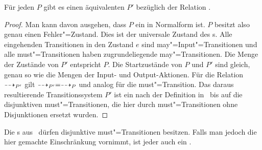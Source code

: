 \begin{Satz}
  Für jeden \MEIO{} $P$ gibt es einen äquivalenten \MIA{} $P'$ bezüglich der
  Relation \ERel{}.
\end{Satz}
\begin{proof}
  Man kann \oBdA{} davon ausgehen, dass $P$ ein \MEIO{} in Normalform ist. $P$
  besitzt also genau einen Fehler"=Zustand. Dies ist der universale Zustand des
  \MIA{}s. Alle eingehenden Transitionen in den Zustand $e$ sind
  may"=Input"=Transitionen und alle must"=Transitionen haben zugrundeliegende
  may"=Transitionen. Die Menge der Zustände von $P'$ entspricht $P$. Die
  Startzustände von $P$ und $P'$ sind gleich, genau so wie die Mengen der
  Input- und Output-Aktionen. Für die Relation $\may _{P'}$ gilt $\may _{P'} =
  \may _{P}$ und analog für die must"=Transition. Das daraus resultierende
  Transitionssystem $P'$ ist ein \MIA{} nach der Definition
  in~\cite{Vogler2016MIA3} bis auf die disjunktiven must"=Transitionen, die
  hier durch must"=Transitionen ohne Disjunktionen ersetzt wurden.
\end{proof}

Die \MIA{}s aus~\cite{Vogler2016MIA3} dürfen disjunktive must"=Transitionen
besitzen. Falls man jedoch die hier gemachte Einschränkung vornimmt, ist jeder
\MIA{} auch ein \MEIO{}.
